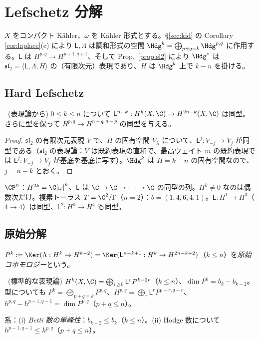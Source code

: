 
\section{Lefschetz 分解}\label{sec:lef}

$X$ をコンパクト Kähler、$\omega$ を Kähler 形式とする。\S\ref{sec:kid} の Corollary \ref{cor:laplace}(c) により $\mathsf L,\Lambda$ は調和形式の空間 $\Hdg^k=\bigoplus_{p+q=k}\Hdg^{p,q}$ に作用する。$\mathsf L$ は $H^{p,q}\to H^{p+1,q+1}$、そして Prop.\ \ref{prop:sl2} により $\Hdg^*$ は $\mathfrak{sl}_2=\langle\mathsf L,\Lambda,H\rangle$ の（有限次元）表現であり、$H$ は $\Hdg^k$ 上で $k-n$ を掛ける。

\subsection{Hard Lefschetz}
\begin{thm}\label{thm:HL}\tP\ (表現論から)
$0\le k\le n$ について $\mathsf L^{n-k}:H^k(X,\C)\to H^{2n-k}(X,\C)$ は同型。さらに型を保って $H^{p,q}\to H^{n-q,n-p}$ の同型を与える。
\end{thm}
\begin{proof}
$\mathfrak{sl}_2$ の有限次元表現 $V$ で、$H$ の固有空間 $V_\lambda$ について、$\mathsf L^{j}:V_{-j}\to V_{j}$ が同型である（$\mathfrak{sl}_2$ の表現論：$V$ は既約表現の直和で、最高ウェイト $m$ の既約表現では $\mathsf L^j:V_{-j}\to V_j$ が基底を基底に写す）。$\Hdg^k$ は $H=k-n$ の固有空間なので、$j=n-k$ とおく。
\end{proof}
\begin{ex}[$\CP^n$、$T^4$]
$\CP^n$：$H^{2k}=\C[\omega]^k$、$\mathsf L$ は $\C\to\C\to\cdots\to\C$ の同型の列。$H^k\ne0$ なのは偶数次だけ。複素トーラス $T=\C^2/\Gamma$（$n=2$）：$b=(1,4,6,4,1)$。$\mathsf L:H^1\to H^3$（$4\to4$）は同型、$\mathsf L^2:H^0\to H^4$ も同型。
\end{ex}

\subsection{原始分解}
$P^k:=\Ker(\Lambda:H^k\to H^{k-2})=\Ker(\mathsf L^{n-k+1}:H^k\to H^{2n-k+2})$（$k\le n$）を\emph{原始コホモロジー}という。
\begin{thm}[Lefschetz 分解]\label{thm:Lef}\tC\ (標準的な表現論)
$H^k(X,\C)=\bigoplus_{r\ge0}\mathsf L^rP^{k-2r}$（$k\le n$）、$\dim P^k=b_k-b_{k-2}$。型についても $P^k=\bigoplus_{p+q=k}P^{p,q}$、$H^{p,q}=\bigoplus_r\mathsf L^rP^{p-r,q-r}$、$h^{p,q}-h^{p-1,q-1}=\dim P^{p,q}$（$p+q\le n$）。
\end{thm}
系：(i) \emph{Betti 数の単峰性}：$b_{k-2}\le b_k$（$k\le n$）。(ii) Hodge 数について $h^{p-1,q-1}\le h^{p,q}$（$p+q\le n$）。

